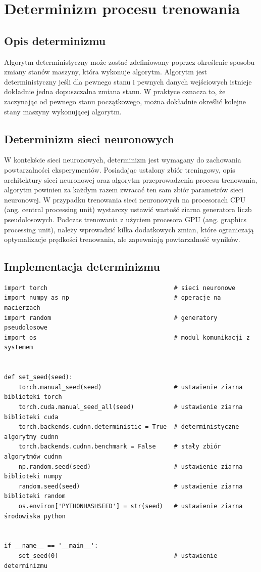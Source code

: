 \chapter{Determinizm procesu trenowania}
\thispagestyle{chapterBeginStyle}

\section{Opis determinizmu}

Algorytm deterministyczny może zostać zdefiniowany poprzez określenie sposobu zmiany stanów maszyny, która wykonuje algorytm. Algorytm jest deterministyczny jeśli dla pewnego stanu i pewnych danych wejściowych istnieje dokładnie jedna dopuszczalna zmiana stanu. W praktyce oznacza to, że zaczynając od pewnego stanu początkowego, można dokładnie określić kolejne stany maszyny wykonującej algorytm.

\section{Determinizm sieci neuronowych}

W kontekście sieci neuronowych, determinizm jest wymagany do zachowania powtarzalności eksperymentów. Posiadając ustalony zbiór treningowy, opis architektury sieci neuronowej oraz algorytm przeprowadzenia procesu trenowania, algorytm powinien za każdym razem zwracać ten sam zbiór parametrów sieci neuronowej. W przypadku trenowania sieci neuronowych na procesorach CPU (ang. central processing unit) wystarczy ustawić wartość ziarna generatora liczb pseudolosowych. Podczas trenowania z użyciem procesora GPU (ang. graphics processing unit), należy wprowadzić kilka dodatkowych zmian, które ograniczają optymalizacje prędkości trenowania, ale zapewniają powtarzalność wyników.

\section{Implementacja determinizmu}
\begin{verbatim}
import torch                                   # sieci neuronowe
import numpy as np                             # operacje na macierzach
import random                                  # generatory pseudolosowe
import os                                      # modul komunikacji z systemem


def set_seed(seed):
    torch.manual_seed(seed)                    # ustawienie ziarna biblioteki torch
    torch.cuda.manual_seed_all(seed)           # ustawienie ziarna biblioteki cuda
    torch.backends.cudnn.deterministic = True  # deterministyczne algorytmy cudnn
    torch.backends.cudnn.benchmark = False     # stały zbiór algorytmów cudnn
    np.random.seed(seed)                       # ustawienie ziarna biblioteki numpy
    random.seed(seed)                          # ustawienie ziarna biblioteki random
    os.environ['PYTHONHASHSEED'] = str(seed)   # ustawienie ziarna środowiska python


if __name__ == '__main__':
    set_seed(0)                                # ustawienie determinizmu

\end{verbatim}


